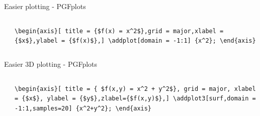 \documentclass[aspectratio=169]{beamer}
\begin{document}
\begin{frame}{Easier plotting - PGFplots}
    \begin{columns}[T]
        \begin{column}{.48\textwidth}
        \end{column}\hfill
        \begin{column}{.48\textwidth}
            \vspace{40pt}
            \texttt{\textbackslash begin\{axis\}[
            title = \{\$f(x) = x\^{}2\$\},grid = major,xlabel = \{\$x\$\},ylabel = \{\$f(x)\$\},]
            \textbackslash addplot[domain = -1:1] \{x\^{}2\}; \textbackslash end\{axis\}}
        \end{column}
    \end{columns}
\end{frame}

\begin{frame}{Easier 3D plotting - PGFplots}
    \begin{columns}[T]
    \begin{column}{.45\textwidth}
        \end{column}\hfill
        \begin{column}{.48\textwidth}
        
            \vspace{30pt}
        
            \texttt{\textbackslash begin\{axis\}[ title = \{ \$f(x,y) = x\^{}2 + y\^{}2\$\}, grid = major, xlabel = \{\$x\$\}, ylabel = \{\$y\$\},zlabel=\{\$f(x,y)\$\},]
                    \textbackslash addplot3[surf,domain = -1:1,samples=20] \{x\^{}2+y\^{}2\};
                \textbackslash end\{axis\}}
        \end{column}
    \end{columns}
\end{frame}
\end{document}
